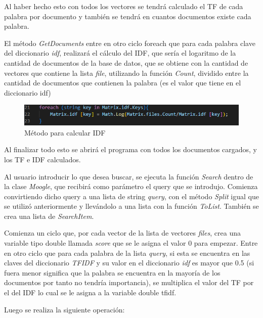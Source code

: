 \documentclass[10pt, letterpaper]{article}
\begin{document}
Al haber hecho esto con todos los vectores se tendrá calculado el TF de cada palabra por documento y también se 
tendrá en cuantos documentos existe cada palabra.

El método \textit{GetDocuments} entre en otro ciclo foreach que para cada palabra clave del diccionario \textit{idf}, realizará 
el cálculo del IDF, que sería el logaritmo de la cantidad de documentos de la base de datos, que se obtiene con
la cantidad de vectores que contiene la lista \textit{file}, utilizando la función \textit{Count}, dividido entre la cantidad de
documentos que contienen la palabra (es el valor que tiene en el diccionario idf)

\begin{figure}[h]

    \centering
    \label{imag: IDF}
    \includegraphics[width=13cm]{IDF.png}
    \caption[]{ \footnotesize Método para calcular IDF}

\end{figure}

Al finalizar todo esto se abrirá el programa con todos los documentos cargados, y los TF e IDF calculados.

Al usuario introducir lo que desea buscar, se ejecuta la función \textit{Search} dentro de la clase \textit{Moogle},
que recibirá como parámetro el query que se introdujo. Comienza convirtiendo dicho query a una lista de string \textit{query}, con el
método \textit{Split} igual que se utilizó anteriormente y llevándolo a una lista con la función \textit{ToList}. También se 
crea una lista de \textit{SearchItem}.

Comienza un ciclo que, por cada vector de la lista de vectores \textit{files}, crea una variable tipo double llamada 
\textit{score} que se le asigna el valor 0 para empezar. Entre en otro ciclo que para cada palabra de la lista \textit{query}, 
si esta se encuentra en las claves del diccionario \textit{TFIDF} y su valor en el diccionario \textit{idf} es mayor que 0.5 
(si fuera menor significa que la palabra se encuentra en la mayoría de los documentos por tanto no tendría 
importancia), se multiplica el valor del TF por el del IDF lo cual se le asigna a la variable double tfidf.

\newpage

Luego se realiza la siguiente operación:
\end{document}
